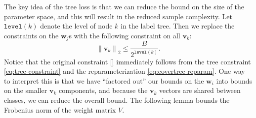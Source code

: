 \documentclass[10pt]{article}
\theoremstyle{definition}
\newcommand{\vv}{\mathbf v}
\newcommand{\w}{\mathbf w}
\newcommand{\ltwo}[1]{{\lVert {#1} \rVert}_2}
\newcommand{\level}[1]{\texttt{level}({#1})}
\begin{document}
The key idea of the tree loss is that we can reduce the bound on the size of the parameter space,
and this will result in the reduced sample complexity.
Let $\level k$ denote the level of node $k$ in the label tree.
Then we replace the constraints on the $\w_j$s with the following constraint on all $\vv_k$:
\begin{equation}
    \ltwo{\vv_k} \le \frac{B}{2^{\level k}}
    .
    \label{eq:tree-constraint}
\end{equation}
Notice that the original constraint \eqref{} immediately follows from the tree constraint \eqref{eq:tree-constraint} and the reparameterization \eqref{eq:covertree-reparam}.
One way to interpret this is that we have ``factored out'' our bounds on the $\w_i$ into bounds on the smaller $\vv_k$ components,
and because the $\vv_k$ vectors are shared between classes,
we can reduce the overall bound.
The following lemma bounds the Frobenius norm of the weight matrix $V$.
\end{document}
